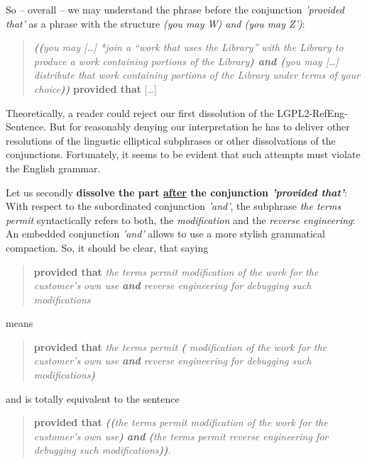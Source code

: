 So -- overall -- we may understand the phrase before the conjunction
\emph{'provided that'} as a phrase with the structure \emph{(you may W) and (you
may Z')}:

\begin{quote}\noindent\emph{\textbf{((}you may [\ldots] \emph{*join} a
\enquote{work that uses the Library} with the Library to produce a work
containing portions of the Library\textbf{) and (}you may [\ldots] distribute
that work containing portions of the Library under terms of your
choice\textbf{))}} \textbf{provided that} [\ldots]\end{quote}

Theoretically, a reader could reject our first dissolution of the
LGPL2-RefEng-Sentence. But for reasonably denying our interpretation he has to
deliver other resolutions of the lingustic elliptical subphrases or other
dissolvations of the conjunctions. Fortunately, it seems to be evident that such
attempts must violate the English grammar.

Let us secondly \textbf{dissolve the part \underline{after} the conjunction
\emph{'provided that'}}: With respect to the subordinated conjunction
\emph{'and'}, the subphrase \emph{the terms permit} syntactically refers to
both, the \emph{modification} and the \emph{reverse engineering}: An embedded
conjunction \emph{'and'} allows to use a more stylish grammatical compaction.
So, it should be clear, that saying

\begin{quote}\noindent\textbf{provided that} \emph{the terms permit modification
of the work for the customer's own use \emph{\textbf{and}} reverse engineering
for debugging such modifications}\end{quote}

means

\begin{quote}\noindent\textbf{provided that} \emph{the terms permit
\textbf{(} modification of the work for the customer's own use \emph{\textbf{and}}
reverse engineering for debugging such modifications\textbf{)}}\end{quote}

and is totally equivalent to the sentence 

\begin{quote}\noindent[\ldots] \textbf{provided that} \emph{\textbf{((}the terms
permit modification of the work for the customer's own use\textbf{)}
\emph{\textbf{and}} \textbf{(}the terms permit reverse engineering for debugging
such modifications\textbf{))}}.
\end{quote}

